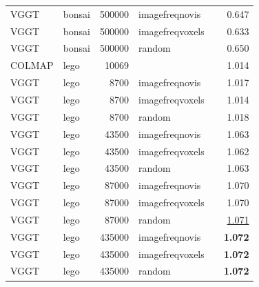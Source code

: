 \begin{table}[H]
\begin{tabular}{llrlrr}
VGGT & bonsai & 500000 & imagefreqnovis &  & 0.647 \\
VGGT & bonsai & 500000 & imagefreqvoxels &  & 0.633 \\
VGGT & bonsai & 500000 & random &  & 0.650 \\
\midrule
COLMAP & lego & 10069 &  &  & 1.014 \\
VGGT & lego & 8700 & imagefreqnovis &  & 1.017 \\
VGGT & lego & 8700 & imagefreqvoxels &  & 1.014 \\
VGGT & lego & 8700 & random &  & 1.018 \\
VGGT & lego & 43500 & imagefreqnovis &  & 1.063 \\
VGGT & lego & 43500 & imagefreqvoxels &  & 1.062 \\
VGGT & lego & 43500 & random &  & 1.063 \\
VGGT & lego & 87000 & imagefreqnovis &  & 1.070 \\
VGGT & lego & 87000 & imagefreqvoxels &  & 1.070 \\
VGGT & lego & 87000 & random &  & \underline{1.071} \\
VGGT & lego & 435000 & imagefreqnovis &  & \textbf{1.072} \\
VGGT & lego & 435000 & imagefreqvoxels &  & \textbf{1.072} \\
VGGT & lego & 435000 & random &  & \textbf{1.072} \\
\bottomrule
\end{tabular}
\end{table}